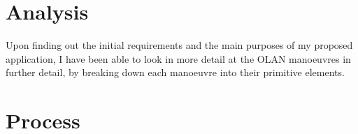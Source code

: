 \section{Analysis}
Upon finding out the initial requirements and the main purposes of my proposed application, I have been able to look in more detail at the OLAN manoeuvres in further detail, by breaking down each manoeuvre into their primitive elements. 

\section{Process}

